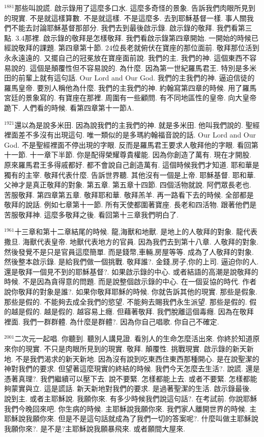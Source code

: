 \documentclass{book}
\begin{document}
$^{1881}$那些叫說謊.
啟示錄用了這麼多口水.
這麼多奇怪的景象.
告訴我們肉眼所見到的現實.
不是就這樣算數.
不是就這樣.
不是這麼多.
去到耶穌基督一樣.
事人關我們不能去討論耶穌基督那部分.
我們去到最後啟示錄.
啟示錄的敬拜.
我們看第三點.
3.4那裡.
啟示錄的敬拜是怎樣敬拜.
我們看啟示錄第四章開始.
一開始的時候已經說敬拜的課題.
第四章第十節.
24位長老就俯伏在寶座的那位面前.
敬拜那位活到永永遠遠的.
又擺自己的冠冕放在寶座面前說.
我們的主.
我們的神.
這個東西不容易說的.
這個是顛覆性但不容易說的.
為什麼.
因為第一世紀羅馬君王.
特別是多米田的前輩上就有這句話.
Our Lord and Our God.
我們的主我們的神.
逼迫信徒的羅馬皇帝.
要別人稱他為什麼.
我們的主我們的神.
約翰寫第四章的時候.
用了羅馬宮廷的景象寫的.
有寶座在那裡.
周圍有一些顧問.
有不同地區性的皇帝.
向大皇帝跪下.
人們看的時候.
看第四章第十一節A.

$^{1921}$還以為是說多米田.
因為說我們的主我們的神.
就是多米田.
他叫我們說的.
聖經裡面差不多沒有出現這句.
唯一類似的是多瑪約翰福音說的話.
Our Lord and Our God.
不是聖經裡面不停出現的字眼.
反而是羅馬君王要求人敬拜他的字眼.
看回第十一節.
十一章下半節.
你是配得榮耀尊貴權能.
因為你創造了萬有.
現在才開股.
原來羅馬君王多得戚都好.
都不會說自己創造萬有.
這個時候我們才知道.
耶和華是獨有的主宰.
敬拜代表什麼.
告訴世界聽.
其他沒有一個是上帝.
耶穌基督.
耶和華.
父神才是真正敬拜的對象.
第五章.
第五章十四節.
四個活物就說.
阿們眾長老也.
苦服敬拜.
第四章第五章.
敬拜耶和華.
敬拜羔羊.
再一路看下去的時候.
全部都是敬拜的說話.
例如七章第十一節.
所有天使都圍著寶座.
長老和四活物.
跟著他們是苦服敬拜神.
這麼多敬拜之後.
看回第十三章我們明白了.

$^{1961}$十三章和第十二章結尾的時候.
龍,海獸和地獸.
是地上的人敬拜的對象.
龍代表撒旦.
海獸代表皇帝.
地獸代表地方的官員.
因為我們去到第十八章.
人敬拜的對象.
然後發覺不是只是官員這麼簡單.
而是錢幣,車輛,房屋等等.
成為了人敬拜的對象.
然後整本啟示錄.
是給我們做一個挑戰.
敬拜誰?.
金錢,房子,你的上司.
逼迫你的人.
還是敬拜一個見不到的耶穌基督?.
如果啟示錄的中心.
或者結語的高潮是說敬拜的時候.
不是因為貪得意的問題.
而是說整個啟示錄的中心.
在一個妥協的時代.
作者說你敬拜的對象是誰?.
如果你敬拜耶穌的時候.
你就告訴其他的現實.
那些是假象.
那些是假的.
不能夠去成全我們的慾望.
不能夠去賜我們永生派望.
那些是假的.
假的越是假的.
越是假的.
越容易上癮.
但藉著敬拜.
我們脫離這個毒癮.
因為在敬拜裡面.
我們一群群體.
為什麼是群體?.
因為你自己唱歌.
你自己不確定.

$^{2001}$二次元一起唱.
你聽到.
聽別人講見證.
看別人的生命怎麼活出來.
你終於知道原來你的現實.
不只是肉眼所見到的現實.
敬拜.
顛覆性.
挑戰現實.
啟示錄的新天新地.
不是我們渴求的新天新地.
因為沒有說到吃東西住東西那種開心.
是在說聖潔的神對我們的要求.
但望著這麼現實的終結的時候.
我們今天怎麼去生活?.
說謊.
還是憑著真理?.
我們繼續可以壓下去.
說不要緊.
怎樣都能上去.
或者不要緊.
怎樣都能夠蒙實與立.
這是謊話.
新天新地對我們的要求.
是過著聖潔的生活.
啟示錄最後.
說到主.
或者主耶穌說.
我願你來.
有多少時候我們說這句話?.
在考試前.
你說耶穌我們今晚回來吧.
你生病的時候.
主耶穌說我願你來.
我們家人離開世界的時候.
主耶穌說我願你來.
但是不是這句話就成為了我們一切的答案呢?.
什麼叫做主耶穌說我願你來?.
是不是?主耶穌說我願暴飛來.
或者願間大屋來.
\end{document}
